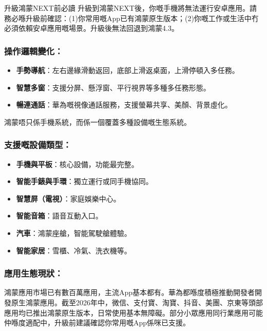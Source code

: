 \begin{tcbwarn}{升級鴻蒙NEXT前必讀}
升級到鴻蒙NEXT後，你嘅手機將無法運行安卓應用。請務必喺升級前確認：(1)你常用嘅App已有鴻蒙原生版本；(2)你嘅工作或生活中冇必須依賴安卓應用嘅場景。升級後無法回退到鴻蒙4.3。

\end{tcbwarn}

\subsubsection*{操作邏輯變化：}

\begin{itemize}
  \item \textbf{手勢導航}：左右邊緣滑動返回，底部上滑返桌面，上滑停頓入多任務。
  \item \textbf{智慧多窗}：支援分屏、懸浮窗、平行視界等多種多任務形態。
  \item \textbf{暢連通話}：華為嘅視像通話服務，支援螢幕共享、美顏、背景虛化。
\end{itemize}


鴻蒙唔只係手機系統，而係一個覆蓋多種設備嘅生態系統。

\subsubsection*{支援嘅設備類型：}

\begin{itemize}
  \item \textbf{手機與平板}：核心設備，功能最完整。
  \item \textbf{智能手錶與手環}：獨立運行或同手機協同。
  \item \textbf{智慧屏（電視）}：家庭娛樂中心。
  \item \textbf{智能音箱}：語音互動入口。
  \item \textbf{汽車}：鴻蒙座艙，智能駕駛艙體驗。
  \item \textbf{智能家居}：雪櫃、冷氣、洗衣機等。
\end{itemize}

\subsubsection*{應用生態現狀：}

鴻蒙應用市場已有數百萬應用，主流App基本都有。華為都喺度積極推動開發者開發原生鴻蒙應用。截至2026年中，微信、支付寶、淘寶、抖音、美團、京東等頭部應用均已推出鴻蒙原生版本，日常使用基本無障礙。部分小眾應用同行業應用可能仲喺度適配中，升級前建議確認你常用嘅App係咪已支援。

